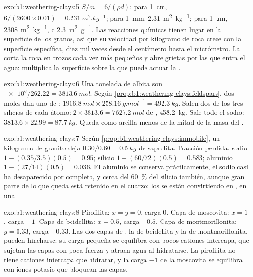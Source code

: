 \begin{solution}{exo:b1:weathering-clays:5}
$S/m = 6/(\rho d)$: para \qty{1}{cm}, $6/(2600\times0.01) =
\qty{0.231}{m^2.kg^{-1}}$; para \qty{1}{mm}, \qty{2.31}{m^2.kg^{-1}}; para
\qty{1}{\micro m}, \qty{2308}{m^2.kg^{-1}}, o \qty{2.3}{m^2.g^{-1}}.
Las reacciones químicas tienen lugar en la superficie de los granos, así que su velocidad por kilogramo de roca crece con la superficie específica,
diez mil veces desde el centímetro hasta el micrómetro. La  corta la roca en trozos cada vez más pequeños y abre grietas por
las que entra el agua: multiplica la superficie sobre la que puede actuar la .
\end{solution}

\begin{solution}{exo:b1:weathering-clays:6}
Una tonelada de albita son $\num{e6}/262.22 = \qty{3813.6}{mol}$. Según
\cref{prop:b1:weathering-clays:feldspars}, dos moles dan uno de :
$\qty{1906.8}{mol} \times \qty{258.16}{g.mol^{-1}} = \qty{492.3}{kg}$. Salen dos de los tres silicios de cada átomo:
$2\times3813.6 = \qty{7627.2}{mol}$ de , \qty{458.2}{kg}. Sale todo el sodio: $3813.6\times22.99 =
\qty{87.7}{kg}$. Queda como arcilla menos de la mitad de la masa del .
\end{solution}

\begin{solution}{exo:b1:weathering-clays:7}
Según \cref{prop:b1:weathering-clays:immobile}, un kilogramo de granito deja
$0.30/0.60 = \qty{0.5}{kg}$ de saprolita. Fracción perdida: sodio $1 -
(0.35/3.5)(0.5) = 0.95$; silicio $1 - (60/72)(0.5) = 0.583$; aluminio $1 -
(27/14)(0.5) = 0.036$. El aluminio se conserva prácticamente, el sodio casi ha desaparecido por completo, y cerca del \qty{60}{\percent} del silicio
también, aunque gran parte de lo que queda está retenido en el cuarzo: los  se están convirtiendo en , en una
.
\end{solution}

\begin{solution}{exo:b1:weathering-clays:8}
Pirofilita: $x = y = 0$, carga 0. Capa de moscovita: $x = 1$, carga $-1$.
Capa de beidellita: $x = 0.5$, carga $-0.5$. Capa de montmorillonita: $y = 0.33$,
carga $-0.33$. Las dos capas de , la de beidellita y la de montmorillonita, pueden
hincharse: su carga pequeña se equilibra con pocos cationes intercapa, que sujetan las
capas con poca fuerza y atraen agua al hidratarse. La pirofilita no tiene cationes intercapa que hidratar, y la carga $-1$ de la moscovita se
equilibra con iones potasio que bloquean las capas.
\end{solution}


